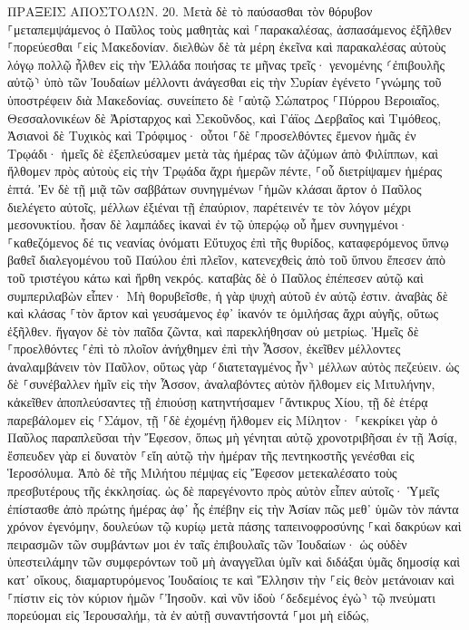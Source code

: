 \documentclass[twoside, 9pt]{extreport}
\begin{document}
ΠΡΑΞΕΙΣ ΑΠΟΣΤΟΛΩΝ.
20.
Μετὰ δὲ τὸ παύσασθαι τὸν θόρυβον ⸀μεταπεμψάμενος ὁ Παῦλος τοὺς μαθητὰς καὶ ⸀παρακαλέσας, ἀσπασάμενος ἐξῆλθεν ⸀πορεύεσθαι ⸀εἰς Μακεδονίαν. 
διελθὼν δὲ τὰ μέρη ἐκεῖνα καὶ παρακαλέσας αὐτοὺς λόγῳ πολλῷ ἦλθεν εἰς τὴν Ἑλλάδα 
ποιήσας τε μῆνας τρεῖς· γενομένης ⸂ἐπιβουλῆς αὐτῷ⸃ ὑπὸ τῶν Ἰουδαίων μέλλοντι ἀνάγεσθαι εἰς τὴν Συρίαν ἐγένετο ⸀γνώμης τοῦ ὑποστρέφειν διὰ Μακεδονίας. 
συνείπετο δὲ ⸀αὐτῷ Σώπατρος ⸀Πύρρου Βεροιαῖος, Θεσσαλονικέων δὲ Ἀρίσταρχος καὶ Σεκοῦνδος, καὶ Γάϊος Δερβαῖος καὶ Τιμόθεος, Ἀσιανοὶ δὲ Τυχικὸς καὶ Τρόφιμος· 
οὗτοι ⸀δὲ ⸀προσελθόντες ἔμενον ἡμᾶς ἐν Τρῳάδι· 
ἡμεῖς δὲ ἐξεπλεύσαμεν μετὰ τὰς ἡμέρας τῶν ἀζύμων ἀπὸ Φιλίππων, καὶ ἤλθομεν πρὸς αὐτοὺς εἰς τὴν Τρῳάδα ἄχρι ἡμερῶν πέντε, ⸀οὗ διετρίψαμεν ἡμέρας ἑπτά. 
Ἐν δὲ τῇ μιᾷ τῶν σαββάτων συνηγμένων ⸀ἡμῶν κλάσαι ἄρτον ὁ Παῦλος διελέγετο αὐτοῖς, μέλλων ἐξιέναι τῇ ἐπαύριον, παρέτεινέν τε τὸν λόγον μέχρι μεσονυκτίου. 
ἦσαν δὲ λαμπάδες ἱκαναὶ ἐν τῷ ὑπερῴῳ οὗ ἦμεν συνηγμένοι· 
⸀καθεζόμενος δέ τις νεανίας ὀνόματι Εὔτυχος ἐπὶ τῆς θυρίδος, καταφερόμενος ὕπνῳ βαθεῖ διαλεγομένου τοῦ Παύλου ἐπὶ πλεῖον, κατενεχθεὶς ἀπὸ τοῦ ὕπνου ἔπεσεν ἀπὸ τοῦ τριστέγου κάτω καὶ ἤρθη νεκρός. 
καταβὰς δὲ ὁ Παῦλος ἐπέπεσεν αὐτῷ καὶ συμπεριλαβὼν εἶπεν· Μὴ θορυβεῖσθε, ἡ γὰρ ψυχὴ αὐτοῦ ἐν αὐτῷ ἐστιν. 
ἀναβὰς δὲ καὶ κλάσας ⸀τὸν ἄρτον καὶ γευσάμενος ἐφ᾽ ἱκανόν τε ὁμιλήσας ἄχρι αὐγῆς, οὕτως ἐξῆλθεν. 
ἤγαγον δὲ τὸν παῖδα ζῶντα, καὶ παρεκλήθησαν οὐ μετρίως. 
Ἡμεῖς δὲ ⸀προελθόντες ⸀ἐπὶ τὸ πλοῖον ἀνήχθημεν ἐπὶ τὴν Ἆσσον, ἐκεῖθεν μέλλοντες ἀναλαμβάνειν τὸν Παῦλον, οὕτως γὰρ ⸂διατεταγμένος ἦν⸃ μέλλων αὐτὸς πεζεύειν. 
ὡς δὲ ⸀συνέβαλλεν ἡμῖν εἰς τὴν Ἆσσον, ἀναλαβόντες αὐτὸν ἤλθομεν εἰς Μιτυλήνην, 
κἀκεῖθεν ἀποπλεύσαντες τῇ ἐπιούσῃ κατηντήσαμεν ⸀ἄντικρυς Χίου, τῇ δὲ ἑτέρᾳ παρεβάλομεν εἰς ⸀Σάμον, τῇ ⸀δὲ ἐχομένῃ ἤλθομεν εἰς Μίλητον· 
⸀κεκρίκει γὰρ ὁ Παῦλος παραπλεῦσαι τὴν Ἔφεσον, ὅπως μὴ γένηται αὐτῷ χρονοτριβῆσαι ἐν τῇ Ἀσίᾳ, ἔσπευδεν γὰρ εἰ δυνατὸν ⸀εἴη αὐτῷ τὴν ἡμέραν τῆς πεντηκοστῆς γενέσθαι εἰς Ἱεροσόλυμα. 
Ἀπὸ δὲ τῆς Μιλήτου πέμψας εἰς Ἔφεσον μετεκαλέσατο τοὺς πρεσβυτέρους τῆς ἐκκλησίας. 
ὡς δὲ παρεγένοντο πρὸς αὐτὸν εἶπεν αὐτοῖς· Ὑμεῖς ἐπίστασθε ἀπὸ πρώτης ἡμέρας ἀφ᾽ ἧς ἐπέβην εἰς τὴν Ἀσίαν πῶς μεθ᾽ ὑμῶν τὸν πάντα χρόνον ἐγενόμην, 
δουλεύων τῷ κυρίῳ μετὰ πάσης ταπεινοφροσύνης ⸀καὶ δακρύων καὶ πειρασμῶν τῶν συμβάντων μοι ἐν ταῖς ἐπιβουλαῖς τῶν Ἰουδαίων· 
ὡς οὐδὲν ὑπεστειλάμην τῶν συμφερόντων τοῦ μὴ ἀναγγεῖλαι ὑμῖν καὶ διδάξαι ὑμᾶς δημοσίᾳ καὶ κατ᾽ οἴκους, 
διαμαρτυρόμενος Ἰουδαίοις τε καὶ Ἕλλησιν τὴν ⸀εἰς θεὸν μετάνοιαν καὶ ⸀πίστιν εἰς τὸν κύριον ἡμῶν ⸀Ἰησοῦν. 
καὶ νῦν ἰδοὺ ⸂δεδεμένος ἐγὼ⸃ τῷ πνεύματι πορεύομαι εἰς Ἰερουσαλήμ, τὰ ἐν αὐτῇ συναντήσοντά ⸀μοι μὴ εἰδώς, 
\end{document}
